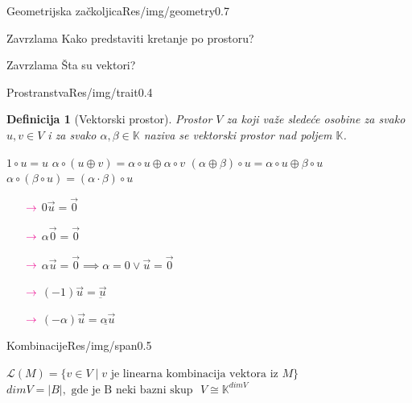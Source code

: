 \documentclass{beamer}
\newtheorem*{df}{Definicija}
\newenvironment{thinker}{\begin{alertblock}{Zavrzlama}}{\end{alertblock}}
\begin{document}
    \begin{framebg}{Geometrijska začkoljica}{Res/img/geometry}{0.7}
        \begin{thinker}
            Kako predstaviti kretanje po prostoru?
        \end{thinker}
        \pause
        \begin{thinker}
            Šta su vektori?
        \end{thinker}
    \end{framebg}
    \begin{framebg}{Prostranstva}{Res/img/trait}{0.4}
        \begin{df}[Vektorski prostor]
            Prostor $V$ za koji važe sledeće osobine za svako
            $u, v \in V$ i za svako $\alpha, \beta \in \mathbb K$
            naziva se vektorski prostor nad poljem $\mathbb K$.
        \end{df}
        \begin{multicols}{2}
            \begin{itemize}
                \itemR  $1 \circ u = u$
                \itemR  $\alpha \circ (u \oplus v) = \alpha \circ u \oplus \alpha \circ v$
                \itemR  $(\alpha \oplus \beta) \circ u = \alpha \circ u \oplus \beta \circ u$
                \itemR  $\alpha \circ (\beta \circ u) = (\alpha \cdot \beta) \circ u$
            \end{itemize}
            \pause
            \columnbreak
            \begin{itemize}
                \item[$\color{magenta} \rightarrow$] $0 \vec u = \vec 0$
                \item[$\color{magenta} \rightarrow$] $\alpha \vec 0 = \vec 0$
                \item[$\color{magenta} \rightarrow$] $\alpha \vec u = \vec 0 \implies \alpha = 0 \lor \vec u = \vec 0$
                \item[$\color{magenta} \rightarrow$] $(-1)  \vec u = \underbar {\vec u}$
                \item[$\color{magenta} \rightarrow$] $(-\alpha) \vec u = \underbar {\alpha \vec u}$
            \end{itemize}
        \end{multicols}
    \end{framebg}
    \begin{framebg}{Kombinacije}{Res/img/span}{0.5}
        \begin{itemize}
            \itemR $\mathcal L(M) = \{ v \in V \mid v \text{ je linearna kombinacija vektora iz } M \}$
            \itemR $dim V = |B|, \text{ gde je B neki bazni skup }$
            \itemR $V \cong \mathbb{K}^{dim V}$
        \end{itemize}
    \end{framebg}
\end{document}
